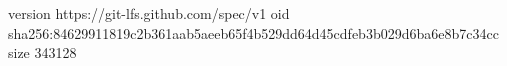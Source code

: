 version https://git-lfs.github.com/spec/v1
oid sha256:84629911819c2b361aab5aeeb65f4b529dd64d45cdfeb3b029d6ba6e8b7c34cc
size 343128
